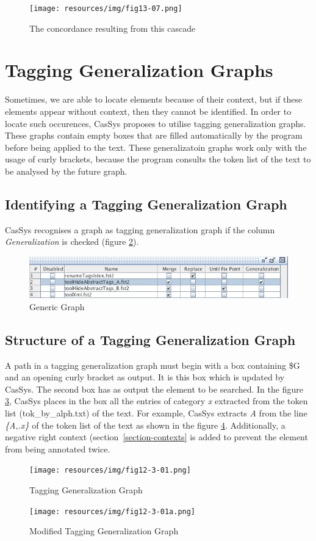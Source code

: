 \begin{figure}[!htb]
  \centering
  \texttt{[image: resources/img/fig13-07.png]}
  \caption{The concordance resulting from this cascade}
  \label{fig13-07}
\end{figure}


\section{Tagging Generalization Graphs}
Sometimes, we are able to locate elements because of their context, but if these elements appear without context, then they cannot be identified. In order to locate such occurences, CasSys proposes to utilise tagging generalization graphs. These graphs contain empty boxes that are filled automatically by the program before being applied to the text. These generalizatoin graphs work only with the usage of curly brackets, because the program consults the token list of the text to be analysed by the future graph.

\subsection{Identifying a Tagging Generalization Graph}
CasSys recognises a graph as tagging generalization graph if the column \emph{Generalization} is checked (figure \ref{fig12-3}).
\begin{figure}[!htb]
  \centering
  \includegraphics[width=15cm]{resources/img/fig12-3.png}
  \caption{Generic Graph}
  \label{fig12-3}
\end{figure}

\subsection{Structure of a Tagging Generalization Graph}
A path in a tagging generalization graph must begin with a box containing \$G and an opening curly bracket as output. It is this box which is updated by CasSys. The second box has as output the element to be searched. In the figure \ref{fig12-3-01}, CasSys places in the box all the entries of category \textit{x} extracted from the token list (tok\_by\_alph.txt) of the text. For example, CasSys extracts  \textit{A} from the line \emph{\{A,.x\}} of the token list of the text as shown in the figure \ref{fig12-3-01a}. Additionally, a negative right context (section~\ref{section-contexts} is added to prevent the element from being annotated twice.
\begin{figure}[!htb]
  \centering
  \texttt{[image: resources/img/fig12-3-01.png]}
  \caption{Tagging Generalization Graph}
  \label{fig12-3-01}
\end{figure}
\begin{figure}[!htb]
  \centering
  \texttt{[image: resources/img/fig12-3-01a.png]}
  \caption{Modified Tagging Generalization Graph}
  \label{fig12-3-01a}
\end{figure}

